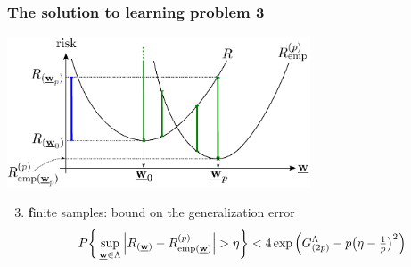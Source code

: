 \begin{frame}\frametitle{The solution to learning problem 3} 
	\begin{center}
		\includegraphics[width=9cm]{img/section2_fig1_question2_lessw}
	\end{center}
	\begin{enumerate}\setcounter{enumi}{2}
		\item {\textbf finite samples:} bound on the generalization error
			\vspace{-2mm}
			$$
				P\bigg\{ \sup\limits_{\vec w \in \Lambda}
					{%
						\Big|R_{(\vec w)} - R^{(p)}_{\text{emp}(\vec w)}\Big| 
					} > \eta
				\bigg\} < 4 \exp\Big( G^\Lambda_{(2p)} 
					- p \big( \eta - \smallfrac{1}{p} \big)^2 \Big)
			$$
			\vspace{-4mm}
	\end{enumerate}
\end{frame}
